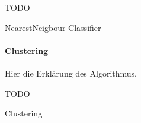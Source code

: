 \begin{algorithm}[H]
	\vspace{0.2cm}
	TODO
	\caption{NearestNeigbour-Classifier}
	\label{alg:nearest_neighbour}
	\vspace{0.2cm}
\end{algorithm}

\paragraph{Clustering}
Hier die Erklärung des Algorithmus.

\begin{algorithm}[H]
	\vspace{0.2cm}
	TODO
	\caption{Clustering}
	\label{alg:cluster}
	\vspace{0.2cm}
\end{algorithm}






